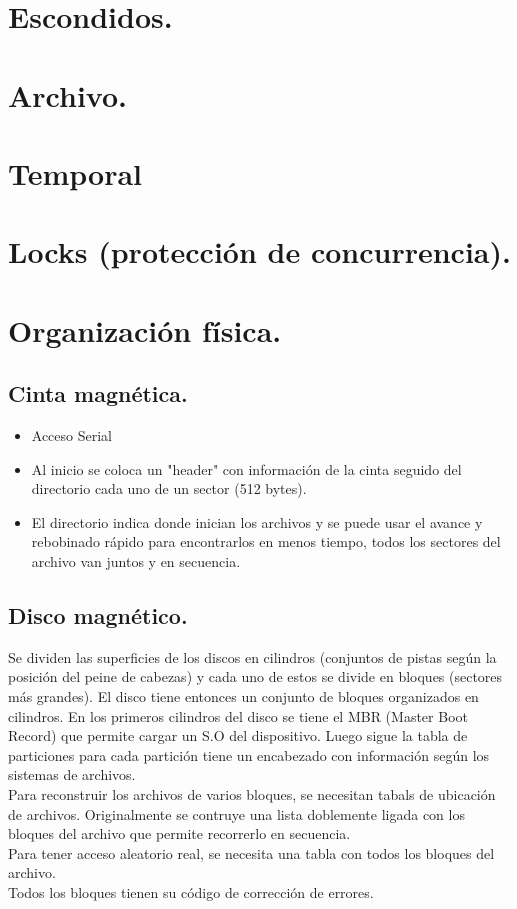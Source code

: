 \section{Escondidos.}
\section{Archivo.}
\section{Temporal}
\section{Locks (protecci\'{o}n de concurrencia).}
\section{Organizaci\'{o}n f\'{i}sica.}
\subsection{Cinta magn\'{e}tica.}
\begin{itemize}
	\item Acceso Serial
	\item Al inicio se coloca un "header" con informaci\'{o}n de la cinta seguido del directorio cada uno de un sector (512 bytes).
	\item El directorio indica donde inician los archivos y se puede usar el avance y rebobinado r\'{a}pido para encontrarlos en menos tiempo, todos los sectores del archivo van juntos y en secuencia.
\end{itemize}
\subsection{Disco magn\'{e}tico.}
Se dividen las superficies de los discos en cilindros (conjuntos de pistas seg\'{u}n la posici\'{o}n del peine de cabezas) y cada uno de estos se divide en bloques (sectores m\'{a}s grandes).
El disco tiene entonces un conjunto de bloques organizados en cilindros. En los primeros cilindros del disco se tiene el MBR (Master Boot Record) que permite cargar un S.O del dispositivo. Luego sigue la tabla de particiones para cada partici\'{o}n tiene un encabezado con informaci\'{o}n seg\'{u}n los sistemas de archivos.\\
Para reconstruir los archivos de varios bloques, se necesitan tabals de ubicaci\'{o}n de archivos. Originalmente se contruye una lista doblemente ligada con los bloques del archivo que permite recorrerlo en secuencia.\\
Para tener acceso aleatorio real, se necesita una tabla con todos los bloques del archivo.\\
Todos los bloques tienen su c\'{o}digo de correcci\'{o}n de errores.\\
